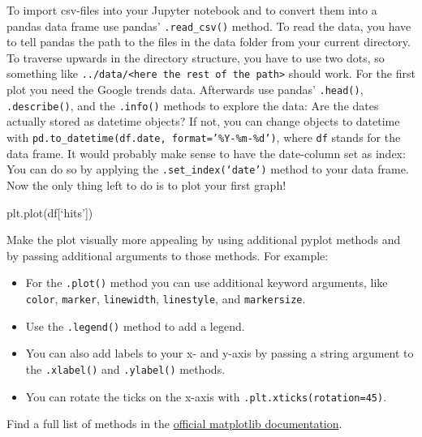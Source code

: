 \documentclass[
  11pt,
]{article}
\newenvironment{Shaded}{\begin{snugshade}}{\end{snugshade}}
\newcommand{\NormalTok}[1]{#1}
\providecommand{\tightlist}{%
  \setlength{\itemsep}{0pt}\setlength{\parskip}{0pt}}
\newenvironment{tipsp}[1]
  {
  \begin{itemize}
  \footnotesize
  \renewcommand{\labelitemi}{
    \raisebox{-.7\height}[0pt][0pt]{
      {\setkeys{Gin}{width=3em,keepaspectratio}
        \texttt{[image: images/\#1.png]}}
    }
  }
  \setlength{\fboxsep}{1em}
  \begin{pbox}
  \item
  }
  {
  \end{pbox}
  \end{itemize}
  }
\begin{document}
\begin{tipsp}p

To import csv-files into your Jupyter notebook and to convert them into a pandas data frame use pandas' \texttt{.read\_csv()} method.
To read the data, you have to tell pandas the path to the files in the data folder from your current directory. To traverse upwards in the directory structure, you have to use two dots, so something like \texttt{../data/\textless{}here\ the\ rest\ of\ the\ path\textgreater{}} should work. For the first plot you need the Google trends data.
Afterwards use pandas' \texttt{.head()}, \texttt{.describe()}, and the \texttt{.info()} methods to explore the data: Are the dates actually stored as datetime objects? If not, you can change objects to datetime with \texttt{pd.to\_datetime(df.date,\ format=’\%Y-\%m-\%d’)}, where \texttt{df} stands for the data frame.
It would probably make sense to have the date-column set as index: You can do so by applying the \texttt{.set\_index(‘date’)} method to your data frame.
Now the only thing left to do is to plot your first graph!

\begin{Shaded}
\begin{Highlighting}[]
\NormalTok{plt.plot(df[‘hits’])}
\end{Highlighting}
\end{Shaded}

Make the plot visually more appealing by using additional pyplot methods and by passing additional arguments to those methods. For example:

\begin{itemize}
\tightlist
\item
  For the \texttt{.plot()} method you can use additional keyword arguments, like \texttt{color}, \texttt{marker}, \texttt{linewidth}, \texttt{linestyle}, and \texttt{markersize}.
\item
  Use the \texttt{.legend()} method to add a legend.
\item
  You can also add labels to your x- and y-axis by passing a string argument to the \texttt{.xlabel()} and \texttt{.ylabel()} methods.
\item
  You can rotate the ticks on the x-axis with \texttt{.plt.xticks(rotation=45)}.
\end{itemize}

Find a full list of methods in the \href{https://matplotlib.org/3.1.1/api/pyplot_summary.html}{official matplotlib documentation}.

\end{tipsp}
\end{document}
